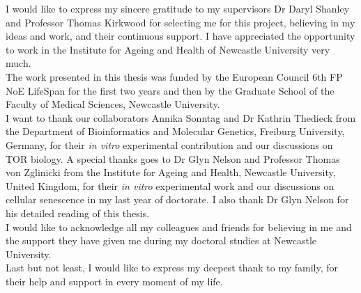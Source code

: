 


\begin{acks}
I would like to express my sincere gratitude to my supervisors Dr Daryl Shanley and Professor Thomas Kirkwood for selecting me for this project, believing in my ideas and work, and their continuous support. I have appreciated the opportunity to work in the Institute for Ageing and Health of Newcastle University very much.\\
The work presented in this thesis was funded by the European Council 6th FP NoE LifeSpan for the first two years and then by the Graduate School of the Faculty of Medical Sciences, Newcastle University.\\
I want to thank our collaborators Annika Sonntag and Dr Kathrin Thedieck from the Department of Bioinformatics and Molecular Genetics, Freiburg University, Germany, for their \emph{in vitro} experimental contribution and our discussions on TOR biology. A special thanks goes to Dr Glyn Nelson and Professor Thomas von Zglinicki from the Institute for Ageing and Health, Newcastle University, United Kingdom, for their \emph{in vitro} experimental work and our discussions on cellular senescence in my last year of doctorate. I also thank Dr Glyn Nelson for his detailed reading of this thesis. \\
I would like to acknowledge all my colleagues and friends for believing in me and the support they have given me during my doctoral studies at Newcastle University.\\
Last but not least, I would like to express my deepest thank to my family, for their help and support in every moment of my life.
\end{acks}




